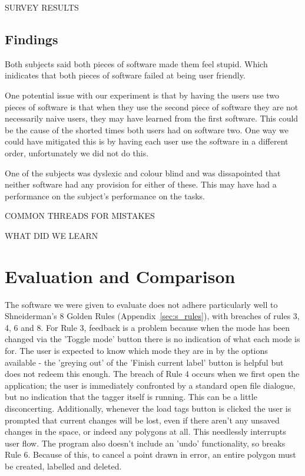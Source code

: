 \documentclass[a4paper,11pt,oneside]{article}
\begin{document}
SURVEY RESULTS

\subsection{Findings}
Both subjects said both pieces of software made them feel stupid.  Which inidicates that both pieces of software failed at being user friendly.

One potential issue with our experiment is that by having the users use two pieces of software is that when they use the second piece of software they are not necessarily naive users, they may have learned from the first software.  This could be the cause of the shorted times both users had on software two.  One way we could have mitigated this is by having each user use the software in a different order, unfortunately we did not do this.

One of the subjects was dyslexic and colour blind and was dissapointed that neither software had any provision for either of these.  This may have had a performance on the subject's performance on the tasks.

COMMON THREADS FOR MISTAKES

WHAT DID WE LEARN

\section{Evaluation and Comparison}

The software we were given to evaluate does not adhere particularly well to Shneiderman's 8 Golden Rules (Appendix~\ref{sec:s_rules}), with breaches of rules 3, 4, 6 and 8. For Rule 3, feedback is a problem because when the mode has been changed via the 'Toggle mode' button there is no indication of what each mode is for. The user is expected to know which mode they are in by the options available - the 'greying out' of the 'Finish current label' button is helpful but does not redeem this enough. The breach of Rule 4 occurs when we first open the application; the user is immediately confronted by a standard open file dialogue, but no indication that the tagger itself is running. This can be a little disconcerting. Additionally, whenever the load tags button is clicked the user is prompted that current changes will be lost, even if there aren't any unsaved changes in the space, or indeed any polygons at all. This needlessly interrupts user flow. The program also doesn't include an 'undo' functionality, so breaks Rule 6. Because of this, to cancel a point drawn in error, an entire polygon must be created, labelled and deleted. 
\end{document}

